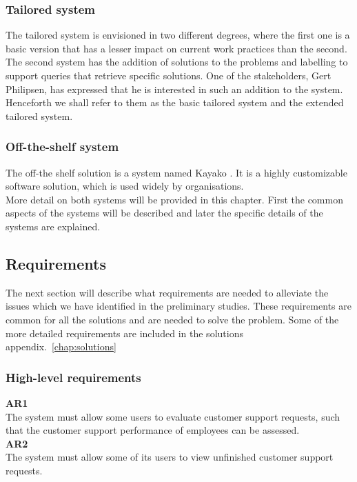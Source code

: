 \subsubsection{Tailored system}
The tailored system is envisioned in two different degrees, where the first one is a basic version that has a lesser impact on current work practices than the second. \\
The second system has the addition of solutions to the problems and labelling to support queries that retrieve specific solutions. One of the stakeholders, Gert Philipsen, has expressed that he is interested in such an addition to the system\cite{gert003}.\\
Henceforth we shall refer to them as the basic tailored system and the extended tailored system.

\subsubsection{Off-the-shelf system}
The off-the shelf solution is a system named Kayako \cite{website005}. It is a highly customizable software solution, which is used widely by organisations.\cite{website006} \\
More detail on both systems will be provided in this chapter. First the common aspects of the systems will be described and later the specific details of the systems are explained.

\subsection{Requirements}
The next section will describe what requirements are needed to alleviate the issues which we have identified in the preliminary studies. These requirements are common for all the solutions and are needed to solve the problem. Some of the more detailed requirements are included in the solutions appendix.~\ref{chap:solutions}

\subsubsection{High-level requirements}
\textbf{AR1} \\
The system must allow some users to evaluate customer support requests, such that the customer support performance of employees can be assessed. \\

\textbf{AR2} \\
The system must allow some of its users to view unfinished customer support requests. \\

